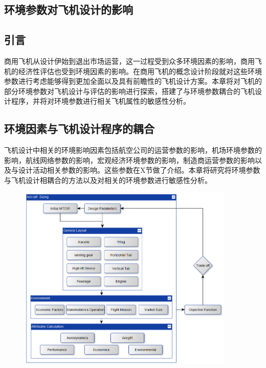 \documentclass[12pt]{article}
\begin{document}
\begin{CJK*}{UTF8}{gbsn}
\section{环境参数对飞机设计的影响}
\subsection{引言}
商用飞机从设计伊始到退出市场运营，这一过程受到众多环境因素的影响，商用飞机的经济性评估也受到环境因素的影响。在商用飞机的概念设计阶段就对这些环境参数进行考虑能够得到更加全面以及具有前瞻性的飞机设计方案。本章将对飞机的部分环境参数对飞机设计与评估的影响进行探索，搭建了与环境参数耦合的飞机设计程序，并将对环境参数进行相关飞机属性的敏感性分析。\par

\subsection{环境因素与飞机设计程序的耦合}
飞机设计中相关的环境影响因素包括航空公司的运营参数的影响，机场环境参数的影响，航线网络参数的影响，宏观经济环境参数的影响，制造商运营参数的影响以及与设计活动相关参数的影响。这些参数在X节做了介绍。本章将研究将环境参数与飞机设计相耦合的方法以及对相关的环境参数进行敏感性分析。\par




\begin{figure}[H]
	\begin{Center}
		\includegraphics[width=4.06in,height=3.5in]{./media511/image1.png}
	\end{Center}
\end{figure}



\end{CJK*}
\end{document}

